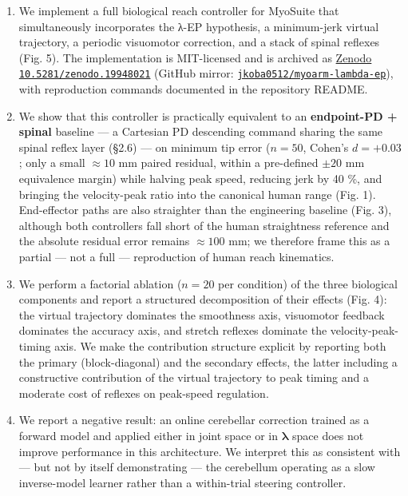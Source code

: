 \documentclass[
  11pt,
]{article}
\providecommand{\tightlist}{%
  \setlength{\itemsep}{0pt}\setlength{\parskip}{0pt}}
\begin{document}
\begin{enumerate}
\def\labelenumi{\arabic{enumi}.}
\tightlist
\item
  We implement a full biological reach controller for MyoSuite that
  simultaneously incorporates the λ-EP hypothesis, a minimum-jerk
  virtual trajectory, a periodic visuomotor correction, and a stack of
  spinal reflexes (Fig. 5). The implementation is MIT-licensed and is
  archived as \href{https://doi.org/10.5281/zenodo.19948021}{Zenodo
  \texttt{10.5281/zenodo.19948021}} (GitHub mirror:
  \href{https://github.com/jkoba0512/myoarm-lambda-ep}{\texttt{jkoba0512/myoarm-lambda-ep}}),
  with reproduction commands documented in the repository README.
\item
  We show that this controller is practically equivalent to an
  \textbf{endpoint-PD + spinal} baseline --- a Cartesian PD descending
  command sharing the same spinal reflex layer (§2.6) --- on minimum tip
  error (\(n = 50\), Cohen's \(d = +0.03\); only a small \(\approx 10\)
  mm paired residual, within a pre-defined \(\pm 20\) mm equivalence
  margin) while halving peak speed, reducing jerk by 40 \%, and bringing
  the velocity-peak ratio into the canonical human range (Fig. 1).
  End-effector paths are also straighter than the engineering baseline
  (Fig. 3), although both controllers fall short of the human
  straightness reference and the absolute residual error remains
  \(\approx 100\) mm; we therefore frame this as a partial --- not a
  full --- reproduction of human reach kinematics.
\item
  We perform a factorial ablation (\(n = 20\) per condition) of the
  three biological components and report a structured decomposition of
  their effects (Fig. 4): the virtual trajectory dominates the
  smoothness axis, visuomotor feedback dominates the accuracy axis, and
  stretch reflexes dominate the velocity-peak-timing axis. We make the
  contribution structure explicit by reporting both the primary
  (block-diagonal) and the secondary effects, the latter including a
  constructive contribution of the virtual trajectory to peak timing and
  a moderate cost of reflexes on peak-speed regulation.
\item
  We report a negative result: an online cerebellar correction trained
  as a forward model and applied either in joint space or in
  \(\boldsymbol{\lambda}\) space does not improve performance in this
  architecture. We interpret this as consistent with --- but not by
  itself demonstrating --- the cerebellum operating as a slow
  inverse-model learner rather than a within-trial steering controller.
\end{enumerate}
\end{document}
